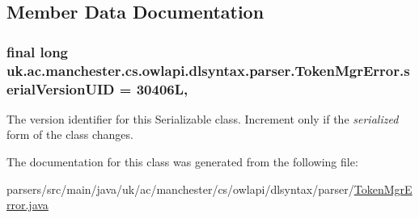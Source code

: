 \subsection{Member Data Documentation}
\hypertarget{classuk_1_1ac_1_1manchester_1_1cs_1_1owlapi_1_1dlsyntax_1_1parser_1_1_token_mgr_error_a56162b20892ae9a7d51fd3c1e878efa5}{
\subsubsection[{serial\-Version\-U\-I\-D}]{\setlength{\rightskip}{0pt plus 5cm}final long uk.\-ac.\-manchester.\-cs.\-owlapi.\-dlsyntax.\-parser.\-Token\-Mgr\-Error.\-serial\-Version\-U\-I\-D = 30406\-L\hspace{0.3cm}{\ttfamily [static]}, {\ttfamily [private]}}}\label{classuk_1_1ac_1_1manchester_1_1cs_1_1owlapi_1_1dlsyntax_1_1parser_1_1_token_mgr_error_a56162b20892ae9a7d51fd3c1e878efa5}
The version identifier for this Serializable class. Increment only if the {\itshape serialized} form of the class changes. 

The documentation for this class was generated from the following file\-:\begin{DoxyCompactItemize}
\item 
parsers/src/main/java/uk/ac/manchester/cs/owlapi/dlsyntax/parser/\hyperlink{uk_2ac_2manchester_2cs_2owlapi_2dlsyntax_2parser_2_token_mgr_error_8java}{Token\-Mgr\-Error.\-java}\end{DoxyCompactItemize}
